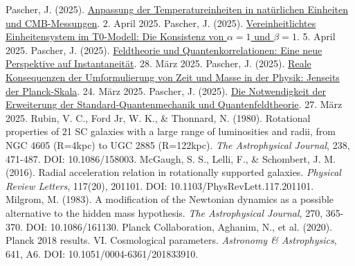 \documentclass[12pt,a4paper]{article}
\begin{document}
\begin{thebibliography}{99}
		 Pascher, J. (2025). \href{https://github.com/jpascher/T0-Time-Mass-Duality/tree/main/2/pdf/Deutsch/Anpassung\%20von\%20Temperatureinheiten\%20in\%20natürlichen\%20Einheiten\%20und\%20CMB-Messungen.pdf}{Anpassung der Temperatureinheiten in natürlichen Einheiten und CMB-Messungen}. 2. April 2025.
		 Pascher, J. (2025). \href{https://github.com/jpascher/T0-Time-Mass-Duality/tree/main/2/pdf/Deutsch/Die\%20Konsistenz\%20von\%20alpha\%20=\%201\%20und\%20beta\%20=\%201.pdf}{Vereinheitlichtes Einheitensystem im T0-Modell: Die Konsistenz von \(\alpha = 1\) und \(\beta = 1\)}. 5. April 2025.
		 Pascher, J. (2025). \href{https://github.com/jpascher/T0-Time-Mass-Duality/tree/main/2/pdf/Deutsch/Feldtheorie\%20und\%20Quantenkorrelationen.pdf}{Feldtheorie und Quantenkorrelationen: Eine neue Perspektive auf Instantaneität}. 28. März 2025.
		 Pascher, J. (2025). \href{https://github.com/jpascher/T0-Time-Mass-Duality/tree/main/2/pdf/Deutsch/Jenseits\%20der\%20Planck-Skala.pdf}{Reale Konsequenzen der Umformulierung von Zeit und Masse in der Physik: Jenseits der Planck-Skala}. 24. März 2025.
		 Pascher, J. (2025). \href{https://github.com/jpascher/T0-Time-Mass-Duality/tree/main/2/pdf/Deutsch/Die\%20Notwendigkeit\%20einer\%20Erweiterung\%20der\%20Standard-Quantenmechanik\%20und\%20Quantenfeldtheorie.pdf}{Die Notwendigkeit der Erweiterung der Standard-Quantenmechanik und Quantenfeldtheorie}. 27. März 2025.
		 Rubin, V. C., Ford Jr, W. K., \& Thonnard, N. (1980). Rotational properties of 21 SC galaxies with a large range of luminosities and radii, from NGC 4605 (R=4kpc) to UGC 2885 (R=122kpc). \textit{The Astrophysical Journal}, 238, 471-487. DOI: 10.1086/158003.
		 McGaugh, S. S., Lelli, F., \& Schombert, J. M. (2016). Radial acceleration relation in rotationally supported galaxies. \textit{Physical Review Letters}, 117(20), 201101. DOI: 10.1103/PhysRevLett.117.201101.
		 Milgrom, M. (1983). A modification of the Newtonian dynamics as a possible alternative to the hidden mass hypothesis. \textit{The Astrophysical Journal}, 270, 365-370. DOI: 10.1086/161130.
		 Planck Collaboration, Aghanim, N., et al. (2020). Planck 2018 results. VI. Cosmological parameters. \textit{Astronomy \& Astrophysics}, 641, A6. DOI: 10.1051/0004-6361/201833910.
	\end{thebibliography}
	
\end{document}
